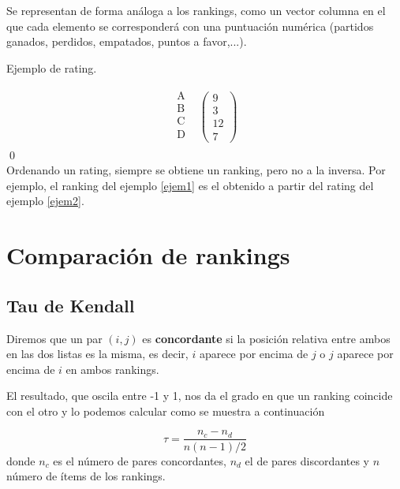 Se representan de forma análoga a los rankings, como un vector columna en el que cada elemento se corresponderá con una puntuación numérica (partidos ganados, perdidos, empatados, puntos a favor,...).

\begin{ejem} \label{ejem2}
Ejemplo de rating.
\end{ejem}
\[
\begin{array}{ccc}
\begin{array}{c}
\text{A}\\
\text{B} \\
\text{C} \\
\text{D} \\
\end{array} & \left(\begin{array}{c}
9\\
3\\
12\\
7
\end{array} \right)
\end{array}  
\]
\qed
\ \\

Ordenando un rating, siempre se obtiene un ranking, pero no a la inversa. Por ejemplo, el ranking del ejemplo \ref{ejem1} es el obtenido a partir del rating del ejemplo \ref{ejem2}.

\section{Comparación de rankings}

\subsection{Tau de Kendall}

\begin{defi} Diremos que un par $(i,j)$ es \textbf{concordante} si la posición relativa entre ambos en las dos listas es la misma, es decir, $i$ aparece por encima de $j$ o $j$ aparece por encima de $i$ en ambos rankings.
\end{defi}

El resultado, que oscila entre -1 y 1, nos da el grado en que un ranking coincide con el otro y lo podemos calcular como se muestra a continuación

\begin{equation}
\tau = \dfrac{n_{c} - n_{d}}{n(n-1)/2}
\end{equation}
donde $n_{c}$ es el número de pares concordantes, $n_{d}$ el de pares discordantes y $n$ número de ítems de los rankings. 

